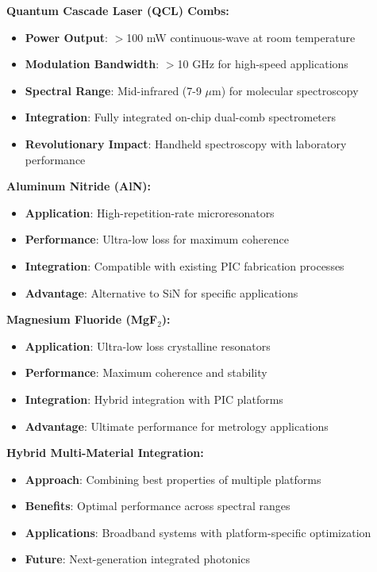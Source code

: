 \documentclass[11pt,a4paper]{article}
\begin{document}
\textbf{Quantum Cascade Laser (QCL) Combs:}
\begin{itemize}
\item \textbf{Power Output}: $>$100 mW continuous-wave at room temperature
\item \textbf{Modulation Bandwidth}: $>$10 GHz for high-speed applications
\item \textbf{Spectral Range}: Mid-infrared (7-9 $\mu$m) for molecular spectroscopy
\item \textbf{Integration}: Fully integrated on-chip dual-comb spectrometers
\item \textbf{Revolutionary Impact}: Handheld spectroscopy with laboratory performance
\end{itemize}

\textbf{Aluminum Nitride (AlN):}
\begin{itemize}
\item \textbf{Application}: High-repetition-rate microresonators
\item \textbf{Performance}: Ultra-low loss for maximum coherence
\item \textbf{Integration}: Compatible with existing PIC fabrication processes
\item \textbf{Advantage}: Alternative to SiN for specific applications
\end{itemize}

\textbf{Magnesium Fluoride (MgF$_2$):}
\begin{itemize}
\item \textbf{Application}: Ultra-low loss crystalline resonators
\item \textbf{Performance}: Maximum coherence and stability
\item \textbf{Integration}: Hybrid integration with PIC platforms
\item \textbf{Advantage}: Ultimate performance for metrology applications
\end{itemize}

\textbf{Hybrid Multi-Material Integration:}
\begin{itemize}
\item \textbf{Approach}: Combining best properties of multiple platforms
\item \textbf{Benefits}: Optimal performance across spectral ranges
\item \textbf{Applications}: Broadband systems with platform-specific optimization
\item \textbf{Future}: Next-generation integrated photonics
\end{itemize}
\end{document}
